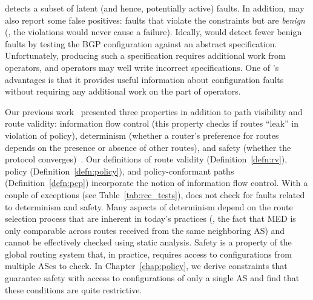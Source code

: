 \rcc detects a subset of latent (and hence,
potentially active) faults.  In addition, \rcc
may also report some false positives: faults that violate the
constraints but are {\em benign} (\ie, the violations 
would never cause a failure).
Ideally, \rcc would detect fewer benign faults 
by testing the BGP configuration against an abstract specification.
Unfortunately,
producing such a specification requires additional work from
operators, and operators may well write incorrect specifications.  
One of \rccns's advantages is that it provides useful information about
configuration faults without requiring any additional work on the part
of operators.


Our previous work~\cite{Feamster2003b} presented three properties in
addition to path visibility and route validity: information flow control
(this property checks if routes ``leak'' in violation of policy),
determinism (whether a router's preference for routes depends on the
presence or absence of other routes), and safety (whether the protocol
converges)~\cite{Griffin2002c}.  Our definitions of route validity
(Definition~\ref{defn:rv}),
policy (Definition~\ref{defn:policy}), and policy-conformant paths
(Definition~\ref{defn:pcp}) incorporate the notion of information flow
control.  With a couple of exceptions (see Table~\ref{tab:rcc_tests}),
\rcc does not check for faults related
to determinism and safety.  Many aspects of determinism depend on the
route selection process that are inherent in today's practices (\eg, the
fact that MED is only comparable across routes received from the same
neighboring AS) and cannot be effectively checked using static analysis.
Safety is a property of the global routing system that, in practice,
requires access to configurations from multiple ASes to check.  In
Chapter~\ref{chap:policy}, we derive constraints that guarantee safety
with access to configurations of only a single AS and find that these
conditions are quite restrictive.













